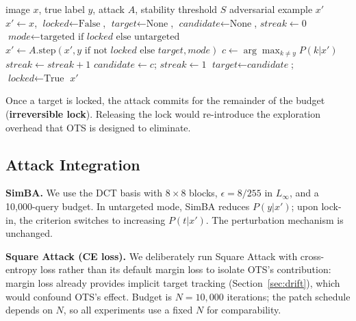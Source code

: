 \documentclass{cap2026}
\begin{document}
\begin{algorithm}[t]
\caption{Opportunistic Target Selection (Rank-Stability Variant)}
\label{alg:ot}
\begin{algorithmic}[1]
\Require image $x$, true label $y$, attack $A$, stability threshold $S$
\Ensure adversarial example $x'$
\State $x' \leftarrow x$, $\textit{locked} \leftarrow \text{False}$, $\textit{target} \leftarrow \text{None}$, $\textit{candidate} \leftarrow \text{None}$, $\textit{streak} \leftarrow 0$
    \State $\textit{mode} \leftarrow \text{targeted if } \textit{locked} \text{ else untargeted}$
    \State $x' \leftarrow A.\text{step}(x', y \text{ if not } \textit{locked} \text{ else } \textit{target}, \textit{mode})$
        \State $c \leftarrow \arg\max_{k \neq y} P(k | x')$
             $\textit{streak} \leftarrow \textit{streak} + 1$
            \Else{} $\textit{candidate} \leftarrow c$; $\textit{streak} \leftarrow 1$
            \EndIf
             $\textit{target} \leftarrow \textit{candidate}$; $\textit{locked} \leftarrow \text{True}$
            \EndIf
        \EndIf
    \EndIf
\EndWhile
\State \Return $x'$
\end{algorithmic}
\end{algorithm}

Once a target is locked, the attack commits for the remainder of the budget (\textbf{irreversible lock}). Releasing the lock would re-introduce the exploration overhead that OTS is designed to eliminate.

\subsection{Attack Integration}\label{sec:integration}

\textbf{SimBA.} We use the DCT basis with $8\times8$ blocks, $\epsilon = 8/255$ in $L_\infty$, and a 10,000-query budget. In untargeted mode, SimBA reduces $P(y|x')$; upon lock-in, the criterion switches to increasing $P(t|x')$. The perturbation mechanism is unchanged.

\textbf{Square Attack (CE loss).} We deliberately run Square Attack with cross-entropy loss rather than its default margin loss to isolate OTS's contribution: margin loss already provides implicit target tracking (Section~\ref{sec:drift}), which would confound OTS's effect. Budget is $N = 10{,}000$ iterations; the patch schedule depends on $N$, so all experiments use a fixed $N$ for comparability.
\end{document}
